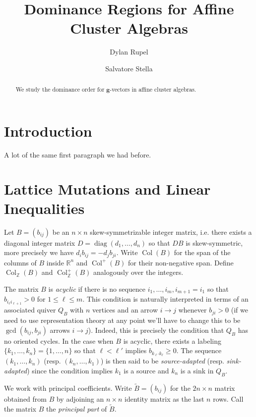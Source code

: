 \documentclass{amsart}
\title{Dominance Regions for Affine Cluster Algebras}
\author{Dylan Rupel}
\author{Salvatore Stella}
\numberwithin{theorem}{section}
\newcommand{\bfg}{\boldsymbol{g}}
\newcommand{\RR}{\mathbb{R}}
\newcommand{\ZZ}{\mathbb{Z}}
\newcommand{\Col}{\operatorname{Col}}
\newcommand{\diag}{\operatorname{diag}}
\begin{document}
  \begin{abstract}
    We study the dominance order for $\bfg$-vectors in affine cluster algebras.
  \end{abstract}
  \maketitle

  \section{Introduction}
  A lot of the same first paragraph we had before.


  \section{Lattice Mutations and Linear Inequalities}
  Let $B=(b_{ij})$ be an $n\times n$ skew-symmetrizable integer matrix, i.e. there exists a diagonal integer matrix $D=\diag(d_1,\ldots,d_n)$ so that $DB$ is skew-symmetric, more precisely we have $d_i b_{ij}=-d_j b_{ji}$.
  Write $\Col(B)$ for the span of the columns of $B$ inside $\RR^n$ and $\Col^+(B)$ for their non-negative span.
  Define $\Col_\ZZ(B)$ and $\Col^+_\ZZ(B)$ analogously over the integers.

  The matrix $B$ is \emph{acyclic} if there is no sequence $i_1,\ldots,i_m,i_{m+1}=i_1$ so that $b_{i_\ell i_{\ell+1}}>0$ for $1\le\ell\le m$.
  This condition is naturally interpreted in terms of an associated quiver $Q_B$ with $n$ vertices and an arrow $i\to j$ whenever $b_{ji}>0$ (if we need to use representation theory at any point we'll have to change this to be $\gcd(b_{ij},b_{ji})$ arrows $i\to j$).
  Indeed, this is precisely the condition that $Q_B$ has no oriented cycles.
  In the case when $B$ is acyclic, there exists a labeling $\{k_1,\ldots,k_n\}=\{1,\ldots,n\}$ so that $\ell<\ell'$ implies $b_{k_{\ell'} k_\ell}\ge 0$.
  The sequence $(k_1,\ldots,k_n)$ (resp. $(k_n,\ldots,k_1)$) is then said to be \emph{source-adapted} (resp. \emph{sink-adapted}) since the condition implies $k_1$ is a source and $k_n$ is a sink in $Q_B$.

  We work with principal coefficients.
  Write $\tilde{B}=(b_{ij})$ for the $2n\times n$ matrix obtained from $B$ by adjoining an $n\times n$ identity matrix as the last $n$ rows.
  Call the matrix $B$ the \emph{principal part} of $\tilde{B}$.
\end{document}
